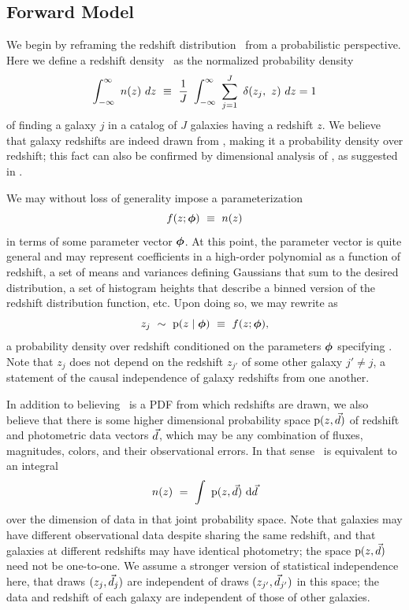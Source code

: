 \subsection{Forward Model}

We begin by reframing the redshift distribution \nz\ from a probabilistic perspective.
Here we define a redshift density \nz\ as the normalized probability density
\begin{equation}
\eqlabel{eqn:nz}
\int_{-\infty}^{\infty}\ n(z)\ dz\ \equiv\ \frac{1}{J}\ \int_{-\infty}^{\infty}\ \sum_{j=1}^{J}\ \delta(z_{j},\ z)\ dz = 1
\end{equation}
of finding a galaxy $j$ in a catalog of $J$ galaxies having a redshift $z$.
We believe that galaxy redshifts are indeed drawn from \nz, making it a probability density over redshift; this fact can also be confirmed by dimensional analysis of , as suggested in \citet{Hogg2012}.

We may without loss of generality impose a parameterization
\begin{equation}
\eqlabel{eqn:fz}
f(z; \ndphi)\ \equiv\ n(z)
\end{equation}
in terms of some parameter vector ${\boldsymbol{\phi}}$.
At this point, the parameter vector is quite general and may represent coefficients in a high-order polynomial as a function of redshift, a set of means and variances defining Gaussians that sum to the desired distribution, a set of histogram heights that describe a binned version of the redshift distribution function, etc.
Upon doing so, we may rewrite  as 
\begin{equation}
\eqlabel{eqn:pz}
z_{j}\ \sim\ \pr{z \gvn \ndphi}\ \equiv\ f(z; \ndphi),
\end{equation}
a probability density over redshift conditioned on the parameters ${\boldsymbol{\phi}}$ specifying \nz.
Note that $z_{j}$ does not depend on the redshift $z_{j'}$ of some other galaxy $j' \neq j$, a statement of the causal independence of galaxy redshifts from one another.

In addition to believing \nz\ is a PDF from which redshifts are drawn, we also believe that there is some higher dimensional probability space $\mathrm{p}(z, \vec{d})$ of redshift and photometric data vectors $\vec{d}$, which may be any combination of fluxes, magnitudes, colors, and their observational errors.
In that sense \nz\ is equivalent to an integral
\begin{equation}
\eqlabel{eqn:integral}
n(z)\ =\ \integral{\pr{z, \data}}{\data}
\end{equation}
over the dimension of data in that joint probability space.
Note that galaxies may have different observational data despite sharing the same redshift, and that galaxies at different redshifts may have identical photometry; the space $\mathrm{p}(z, \vec{d})$ need not be one-to-one.
We assume a stronger version of statistical independence here, that draws $(z_{j}, \vec{d}_{j})$ are independent of draws $(z_{j'}, \vec{d}_{j'})$ in this space; the data and redshift of each galaxy are independent of those of other galaxies.

